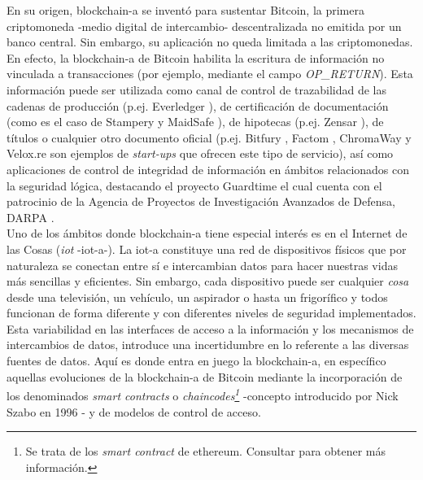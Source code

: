 \documentclass[12pt,a4paper, twoside]{report}
\begin{document}
	En su origen, \gls{blockchain-a} se inventó para sustentar Bitcoin, la primera criptomoneda -medio digital de intercambio- descentralizada no emitida por un banco central. Sin embargo, su aplicación no queda limitada a las criptomonedas. En efecto, la \gls{blockchain-a} de Bitcoin habilita la escritura de información no vinculada a transacciones (por ejemplo, mediante el campo \textit{OP\_RETURN}). Esta información puede ser utilizada como canal de control de trazabilidad de las cadenas de producción (p.ej. Everledger \cite{everledger}), de certificación de documentación (como es el caso de Stampery \cite{stampery} y MaidSafe \cite{maidsafe}), de hipotecas (p.ej. Zensar \cite{zensar}), de títulos o cualquier otro documento oficial (p.ej. Bitfury \cite{bitfury}, Factom \cite{factom}, ChromaWay \cite{chromaway} y Velox.re \cite{velox} son ejemplos de \textit{start-ups} que ofrecen este tipo de servicio), así como aplicaciones de control de integridad de información en ámbitos relacionados con la seguridad lógica, destacando el proyecto Guardtime \cite{guardtime} el cual cuenta con el patrocinio de la Agencia de Proyectos de Investigación Avanzados de Defensa, DARPA \cite{darpa}. \\

	Uno de los ámbitos donde \gls{blockchain-a} tiene especial interés es en el Internet de las Cosas (\textit{\gls{iot}} -\gls{iot-a}-). La \gls{iot-a} constituye una red de dispositivos físicos que por naturaleza se conectan entre sí e intercambian datos para hacer nuestras vidas más sencillas y eficientes. Sin embargo, cada dispositivo puede ser cualquier \textit{cosa} desde una televisión, un vehículo, un aspirador o hasta un frigorífico y todos funcionan de forma diferente y con diferentes niveles de seguridad implementados. Esta variabilidad en las interfaces de acceso a la información y los mecanismos de intercambios de datos, introduce una incertidumbre en lo referente a las diversas fuentes de datos. Aquí es donde entra en juego la \gls{blockchain-a}, en específico aquellas evoluciones de la \gls{blockchain-a} de Bitcoin mediante la incorporación de los denominados \textit{smart contracts} o \textit{\glspl{chaincode}\footnote{Se trata de los \textit{smart contract} de \gls{ethereum}. Consultar \cite{ethereum} para obtener más información.}} -concepto introducido por Nick Szabo en 1996 \cite{szabo:1997:FSRPN}- y de modelos de control de acceso.	\\
	
\end{document}
